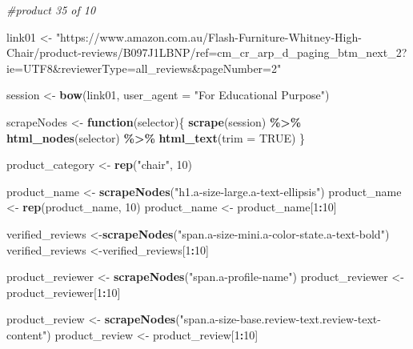 \documentclass[
]{article}
\newenvironment{Shaded}{\begin{snugshade}}{\end{snugshade}}
\newcommand{\AttributeTok}[1]{\textcolor[rgb]{0.13,0.29,0.53}{#1}}
\newcommand{\CommentTok}[1]{\textcolor[rgb]{0.56,0.35,0.01}{\textit{#1}}}
\newcommand{\ConstantTok}[1]{\textcolor[rgb]{0.56,0.35,0.01}{#1}}
\newcommand{\ControlFlowTok}[1]{\textcolor[rgb]{0.13,0.29,0.53}{\textbf{#1}}}
\newcommand{\DecValTok}[1]{\textcolor[rgb]{0.00,0.00,0.81}{#1}}
\newcommand{\FunctionTok}[1]{\textcolor[rgb]{0.13,0.29,0.53}{\textbf{#1}}}
\newcommand{\NormalTok}[1]{#1}
\newcommand{\OtherTok}[1]{\textcolor[rgb]{0.56,0.35,0.01}{#1}}
\newcommand{\SpecialCharTok}[1]{\textcolor[rgb]{0.81,0.36,0.00}{\textbf{#1}}}
\newcommand{\StringTok}[1]{\textcolor[rgb]{0.31,0.60,0.02}{#1}}
\begin{document}
\begin{Shaded}
\begin{Highlighting}[]
\CommentTok{\#product 35 of 10}

\NormalTok{link01 }\OtherTok{\textless{}{-}} \StringTok{"https://www.amazon.com.au/Flash{-}Furniture{-}Whitney{-}High{-}Chair/product{-}reviews/B097J1LBNP/ref=cm\_cr\_arp\_d\_paging\_btm\_next\_2?ie=UTF8\&reviewerType=all\_reviews\&pageNumber=2"}


\NormalTok{  session }\OtherTok{\textless{}{-}} \FunctionTok{bow}\NormalTok{(link01,}
               \AttributeTok{user\_agent =} \StringTok{"For Educational Purpose"}\NormalTok{)}

\NormalTok{  scrapeNodes }\OtherTok{\textless{}{-}} \ControlFlowTok{function}\NormalTok{(selector)\{}
    \FunctionTok{scrape}\NormalTok{(session) }\SpecialCharTok{\%\textgreater{}\%}
      \FunctionTok{html\_nodes}\NormalTok{(selector) }\SpecialCharTok{\%\textgreater{}\%}
      \FunctionTok{html\_text}\NormalTok{(}\AttributeTok{trim =} \ConstantTok{TRUE}\NormalTok{)}
\NormalTok{  \}}

\NormalTok{  product\_category }\OtherTok{\textless{}{-}} \FunctionTok{rep}\NormalTok{(}\StringTok{"chair"}\NormalTok{, }\DecValTok{10}\NormalTok{)}

\NormalTok{  product\_name }\OtherTok{\textless{}{-}} \FunctionTok{scrapeNodes}\NormalTok{(}\StringTok{"h1.a{-}size{-}large.a{-}text{-}ellipsis"}\NormalTok{)}
\NormalTok{  product\_name }\OtherTok{\textless{}{-}} \FunctionTok{rep}\NormalTok{(product\_name, }\DecValTok{10}\NormalTok{)}
\NormalTok{  product\_name }\OtherTok{\textless{}{-}}\NormalTok{ product\_name[}\DecValTok{1}\SpecialCharTok{:}\DecValTok{10}\NormalTok{]}
  
\NormalTok{  verified\_reviews }\OtherTok{\textless{}{-}}\FunctionTok{scrapeNodes}\NormalTok{(}\StringTok{"span.a{-}size{-}mini.a{-}color{-}state.a{-}text{-}bold"}\NormalTok{)}
\NormalTok{  verified\_reviews }\OtherTok{\textless{}{-}}\NormalTok{verified\_reviews[}\DecValTok{1}\SpecialCharTok{:}\DecValTok{10}\NormalTok{]}
  
\NormalTok{  product\_reviewer }\OtherTok{\textless{}{-}} \FunctionTok{scrapeNodes}\NormalTok{(}\StringTok{"span.a{-}profile{-}name"}\NormalTok{)}
\NormalTok{  product\_reviewer }\OtherTok{\textless{}{-}}\NormalTok{ product\_reviewer[}\DecValTok{1}\SpecialCharTok{:}\DecValTok{10}\NormalTok{]}
  
\NormalTok{  product\_review }\OtherTok{\textless{}{-}} \FunctionTok{scrapeNodes}\NormalTok{(}\StringTok{"span.a{-}size{-}base.review{-}text.review{-}text{-}content"}\NormalTok{)}
\NormalTok{  product\_review }\OtherTok{\textless{}{-}}\NormalTok{ product\_review[}\DecValTok{1}\SpecialCharTok{:}\DecValTok{10}\NormalTok{]}
  

\end{Highlighting}
\end{Shaded}
\end{document}
